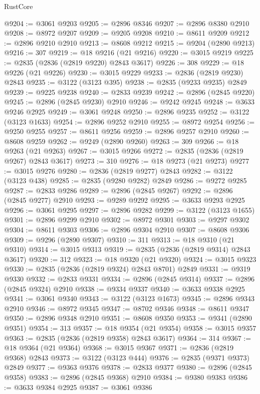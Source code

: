 \begin{lexlean}{RustCore}
\begin{coremodule}
@9204 := @3061 @9203
@9205 := @2896 @8346
@9207 := @2896 @8380 @2910
@9208 := @8972 @9207
@9209 := @9205 @9208
@9210 := @8611 @9209
@9212 := @2896 @9210 @2910
@9213 := @8608 @9212
@9215 := @9204 (@2890 @9213)
@9216 := 307
@9219 := @18 @9216 (@21 @9216)
@9220 := @3015 @9219
@9225 := @2835 (@2836 (@2819 @9220) @2843 @3617)
@9226 := 308
@9229 := @18 @9226 (@21 @9226)
@9230 := @3015 @9229
@9233 := @2836 (@2819 @9230) @2843
@9235 := @3122 (@3123 @395)
@9238 := @2835 (@9233 @9235) @2849
@9239 := @9225 @9238
@9240 := @2833 @9239
@9242 := @2896 (@2845 @9220)
@9245 := @2896 (@2845 @9230) @2910
@9246 := @9242 @9245
@9248 := @3633 @9246 @2925
@9249 := @3061 @9248
@9250 := @2896 @9235
@9252 := @3122 (@3123 @1633)
@9254 := @2896 @9252 @2910
@9255 := @8972 @9254
@9256 := @9250 @9255
@9257 := @8611 @9256
@9259 := @2896 @9257 @2910
@9260 := @8608 @9259
@9262 := @9249 (@2890 @9260)
@9263 := 309
@9266 := @18 @9263 (@21 @9263)
@9267 := @3015 @9266
@9272 := @2835 (@2836 (@2819 @9267) @2843 @3617)
@9273 := 310
@9276 := @18 @9273 (@21 @9273)
@9277 := @3015 @9276
@9280 := @2836 (@2819 @9277) @2843
@9282 := @3122 (@3123 @438)
@9285 := @2835 (@9280 @9282) @2849
@9286 := @9272 @9285
@9287 := @2833 @9286
@9289 := @2896 (@2845 @9267)
@9292 := @2896 (@2845 @9277) @2910
@9293 := @9289 @9292
@9295 := @3633 @9293 @2925
@9296 := @3061 @9295
@9297 := @2896 @9282
@9299 := @3122 (@3123 @1655)
@9301 := @2896 @9299 @2910
@9302 := @8972 @9301
@9303 := @9297 @9302
@9304 := @8611 @9303
@9306 := @2896 @9304 @2910
@9307 := @8608 @9306
@9309 := @9296 (@2890 @9307)
@9310 := 311
@9313 := @18 @9310 (@21 @9310)
@9314 := @3015 @9313
@9319 := @2835 (@2836 (@2819 @9314) @2843 @3617)
@9320 := 312
@9323 := @18 @9320 (@21 @9320)
@9324 := @3015 @9323
@9330 := @2835 (@2836 (@2819 @9324) @2843 @8701) @2849
@9331 := @9319 @9330
@9332 := @2833 @9331
@9334 := @2896 (@2845 @9314)
@9337 := @2896 (@2845 @9324) @2910
@9338 := @9334 @9337
@9340 := @3633 @9338 @2925
@9341 := @3061 @9340
@9343 := @3122 (@3123 @1673)
@9345 := @2896 @9343 @2910
@9346 := @8972 @9345
@9347 := @8702 @9346
@9348 := @8611 @9347
@9350 := @2896 @9348 @2910
@9351 := @8608 @9350
@9353 := @9341 (@2890 @9351)
@9354 := 313
@9357 := @18 @9354 (@21 @9354)
@9358 := @3015 @9357
@9363 := @2835 (@2836 (@2819 @9358) @2843 @3617)
@9364 := 314
@9367 := @18 @9364 (@21 @9364)
@9368 := @3015 @9367
@9371 := @2836 (@2819 @9368) @2843
@9373 := @3122 (@3123 @444)
@9376 := @2835 (@9371 @9373) @2849
@9377 := @9363 @9376
@9378 := @2833 @9377
@9380 := @2896 (@2845 @9358)
@9383 := @2896 (@2845 @9368) @2910
@9384 := @9380 @9383
@9386 := @3633 @9384 @2925
@9387 := @3061 @9386

\end{coremodule}
\end{lexlean}
